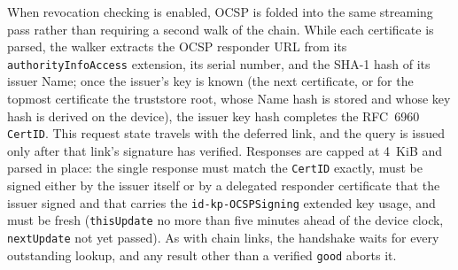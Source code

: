 \documentclass[titlepage]{report}
\begin{document}
	When revocation checking is enabled, OCSP is folded into the same streaming pass rather than requiring a second walk of the chain. While each certificate is parsed, the walker extracts the OCSP responder URL from its \texttt{authorityInfoAccess} extension, its serial number, and the SHA-1 hash of its issuer Name; once the issuer's key is known (the next certificate, or for the topmost certificate the truststore root, whose Name hash is stored and whose key hash is derived on the device), the issuer key hash completes the RFC~6960 \texttt{CertID}. This request state travels with the deferred link, and the query is issued only after that link's signature has verified. Responses are capped at 4~KiB and parsed in place: the single response must match the \texttt{CertID} exactly, must be signed either by the issuer itself or by a delegated responder certificate that the issuer signed and that carries the \texttt{id-kp-OCSPSigning} extended key usage, and must be fresh (\texttt{thisUpdate} no more than five minutes ahead of the device clock, \texttt{nextUpdate} not yet passed). As with chain links, the handshake waits for every outstanding lookup, and any result other than a verified \texttt{good} aborts it.
\end{document}
